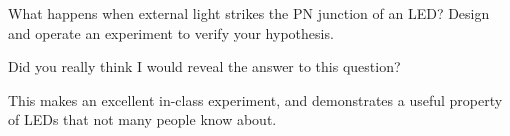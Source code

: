

What happens when external light strikes the PN junction of an LED?  Design and operate an experiment to verify your hypothesis.







Did you really think I would reveal the answer to this question?







This makes an excellent in-class experiment, and demonstrates a useful property of LEDs that not many people know about.




